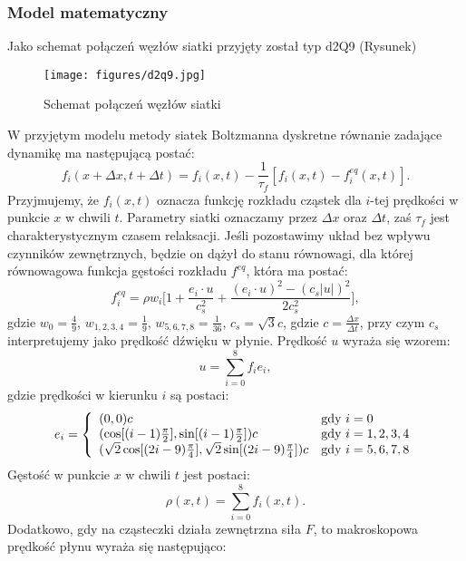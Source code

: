 \documentclass[12pt]{article}
\begin{document}
\subsubsection{Model matematyczny}
Jako schemat połączeń węzłów siatki przyjęty został typ d2Q9 (Rysunek)
\begin{figure}[H]
	\texttt{[image: figures/d2q9.jpg]} 
	\centering
	\caption{Schemat połączeń węzłów siatki}
\end{figure}
W przyjętym modelu metody siatek Boltzmanna dyskretne równanie zadające dynamikę ma następującą postać:
\begin{equation}
f_{i}(x + \Delta x, t + \Delta t) = f_{i}(x,t) - \frac{1}{\tau_f}[f_{i}(x,t) - f_{i}^{eq}(x,t)].
\end{equation}
Przyjmujemy, że $f_{i}(x,t)$ oznacza funkcję rozkładu cząstek dla $i$-tej prędkości w punkcie $x$ w chwili $t$. Parametry siatki oznaczamy przez $\Delta x$ oraz $\Delta t$, zaś $\tau_f$ jest charakterystycznym czasem relaksacji.
Jeśli pozostawimy układ bez wpływu czynników zewnętrznych, będzie on dążył do stanu równowagi, dla której równowagowa funkcja gęstości rozkładu $f^{eq}$, która ma postać:
\begin{equation}
f_{i}^{eq} = \rho w_{i} \Bigg[1 + \frac{e_i \cdot u}{c_{s}^{2}} + 
\frac{(e_i \cdot u)^2 - (c_s|u|)^2}{2 c_{s}^{2}}\Bigg],
\end{equation}
gdzie $w_0 = \frac{4}{9}$, $w_{1,2,3,4} = \frac{1}{9}$, $w_{5,6,7,8} = \frac{1}{36}$, $c_s = \sqrt{3}c$, gdzie $c = \frac{\Delta x}{\Delta t}$, przy czym $c_s$ interpretujemy jako prędkość dźwięku w płynie. Prędkość $u$ wyraża się wzorem:
\begin{equation}
u = \sum_{i=0}^{8}f_{i}e_{i},
\end{equation}
gdzie prędkości w kierunku $i$ są postaci:
\begin{equation}
e_i = \left\{ \begin{array}{ll}
(0,0)c & \textrm{gdy $i = 0$}\\
(\cos[(i-1)\frac{\pi}{2}], \sin[(i-1)\frac{\pi}{2}])c & \textrm{gdy $i=1,2,3,4$}\\
(\sqrt{2}\cos[(2i-9)\frac{\pi}{4}],\sqrt{2}\sin[(2i-9)\frac{\pi}{4}])c & \textrm{gdy $ i=5,6,7,8 $}
\end{array} \right.
\end{equation}
Gęstość w punkcie $x$ w chwili $t$ jest postaci:
\begin{equation}
\rho(x,t) = \sum_{i=0}^{8}f_{i}(x,t).
\end{equation}
Dodatkowo, gdy na cząsteczki działa zewnętrzna siła $F$, to makroskopowa prędkość płynu wyraża się następująco:
\end{document}
